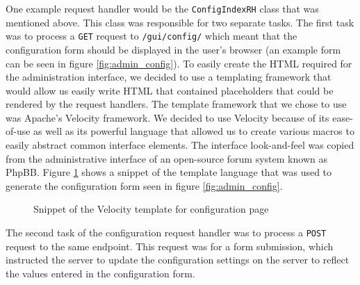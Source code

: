 One example request handler would be the \texttt{ConfigIndexRH} class that was mentioned above. This class was responsible for two separate tasks. The first task was to process a \texttt{GET} request to \texttt{/gui/config/} which meant that the configuration form should be displayed in the user's browser (an example form can be seen in figure \ref{fig:admin_config}). To easily create the HTML required for the administration interface, we decided to use a templating framework that would allow us easily write HTML that contained placeholders that could be rendered by the request handlers. The template framework that we chose to use was Apache's Velocity\cite{velocity} framework. We decided to use Velocity because of its ease-of-use as well as its powerful language that allowed us to create various macros to easily abstract common interface elements. The interface look-and-feel was copied from the administrative interface of an open-source forum system known as PhpBB\cite{phpbb}. Figure \ref{code:tpl_config} shows a snippet of the template language that was used to generate the configuration form seen in figure \ref{fig:admin_config}.

\begin{figure}[h!]
  \centering
  \small
  
  \normalsize
  \caption{Snippet of the Velocity template for configuration page}
  \label{code:tpl_config}
\end{figure}

The second task of the configuration request handler was to process a \texttt{POST} request to the same endpoint. This request was for a form submission, which instructed the server to update the configuration settings on the server to reflect the values entered in the configuration form.